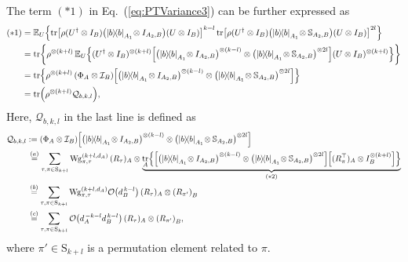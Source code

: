 \documentclass[aps,prl,twocolumn,nofootinbib,superscriptaddress,10pt]{revtex4-2}
\let\originalleft\left
\let\originalright\right
\renewcommand{\left}{\mathopen{}\mathclose\bgroup\originalleft}
\renewcommand{\right}{\aftergroup\egroup\originalright}
\def\E{ {\mathbb E} } %
\newcommand{\ketbra}[2]{\ensuremath{\left|#1\right\rangle\!\left\langle#2\right|}}
\DeclareMathOperator{\Tr}{tr}
\newcommand{\bigo}[1]{\mathcal{O}\left(#1\right)}
\theoremstyle{plain}
\theoremstyle{definition}
\newcommand{\Wg}{\mathrm{Wg}}
\newcommand{\eref}[1]{Eq.~\textup{(\ref{#1})}}
\begin{document}
The term $(*1)$ in \eref{eq:PTVariance3} can be further expressed as
\begin{align}\label{eq:PTVariance4} 
(*1)
&= 
\E_{U} \left\lbrace 
\Tr\left[\rho(U^{\dag}\otimes I_B) \left(\ketbra{b}{b}_{A_1} \!\otimes I_{A_2,B} \right) (U\otimes I_B) \right]^{k-l}
\Tr\left[\rho(U^{\dag}\otimes I_B) \left(\ketbra{b}{b}_{A_1} \!\otimes \mathbb{S}_{A_2,B} \right) (U\otimes I_B) \right]^{2l} 
\right\rbrace
\nonumber\\
&= 
\Tr \!\bigg\{ \rho^{\otimes (k+l)} \, \E_{U} \left\{(U^{\dag}\otimes I_B)^{\otimes (k+l)} 
\left[\left(\ketbra{b}{b}_{A_1} \!\otimes I_{A_2,B} \right)^{\otimes (k-l)}\otimes
\left(\ketbra{b}{b}_{A_1} \!\otimes \mathbb{S}_{A_2,B} \right)^{\otimes 2l} \right]
(U\otimes I_B)^{\otimes (k+l)} \right\} \bigg\}
\nonumber\\
&= 
\Tr\left\{\rho^{\otimes (k+l)} \, \left(\Phi_{A}\otimes \mathcal{I}_{B} \right) 
\left[\left(\ketbra{b}{b}_{A_1} \!\otimes I_{A_2,B} \right)^{\otimes (k-l)}\otimes
\left(\ketbra{b}{b}_{A_1} \!\otimes \mathbb{S}_{A_2,B} \right)^{\otimes 2l} \right]  \right\}
\nonumber\\
&= \Tr \left( \rho^{\otimes (k+l)}\mathcal{Q}_{b,k,l}\right) , 
\end{align}
Here, $\mathcal{Q}_{b,k,l}$ in the last line is defined as 
\begin{align}\label{eq:PTVariance5} 
\mathcal{Q}_{b,k,l}
&:=
\left(\Phi_{A}\otimes \mathcal{I}_{B} \right) 
\left[\left(\ketbra{b}{b}_{A_1} \!\otimes I_{A_2,B} \right)^{\otimes (k-l)}\otimes
\left(\ketbra{b}{b}_{A_1} \!\otimes \mathbb{S}_{A_2,B} \right)^{\otimes 2l} \right]
\nonumber\\
&\,\stackrel{(a)}{=} \sum_{\tau,\pi\in \mathrm{S}_{k+l}} \Wg_{\pi,\tau}^{(k+l,d_A)} \, 
(R_{\tau})_A \otimes 
\underbrace{\Tr_A \left\lbrace  \left[\left(\ketbra{b}{b}_{A_1} \!\otimes I_{A_2,B} \right)^{\otimes (k-l)}\otimes
\left(\ketbra{b}{b}_{A_1} \!\otimes \mathbb{S}_{A_2,B} \right)^{\otimes 2l} \right] 
\left[ (R_{\pi}^{\top})_A \otimes I_B^{\otimes (k+l)} \right] \right\rbrace }_{(*2)}
\nonumber\\
&\,\stackrel{(b)}{=} \sum_{\tau,\pi\in \mathrm{S}_{k+l}} \Wg_{\pi,\tau}^{(k+l,d_A)} \bigo{d_B^{\,k-l}} \, 
(R_{\tau})_A \otimes \left(R_{\pi'} \right)_B
\nonumber\\
&\,\stackrel{(c)}{=} \sum_{\tau,\pi\in \mathrm{S}_{k+l}} \bigo{d_A^{\,-k-l} d_B^{\,k-l}} \, 
(R_{\tau})_A \otimes \left(R_{\pi'} \right)_B, 
\end{align}
where $\pi'\in \mathrm{S}_{k+l}$ is a permutation element related to $\pi$. 
\end{document}
